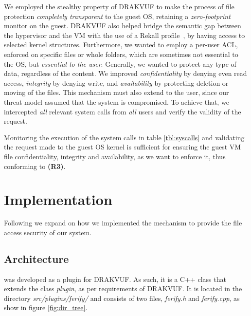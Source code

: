 \par We employed the stealthy property of DRAKVUF to make the process of file protection \emph{completely transparent} to the guest \ac{OS}, retaining a \emph{zero-footprint} monitor on the guest. DRAKVUF also helped bridge the semantic gap between the hypervisor and the \ac{VM} with the use of a Rekall profile~\cite{rekall}, by having access to selected kernel structures. Furthermore, we wanted to employ a per-user \ac{ACL}, enforced on specific files or whole folders, which are sometimes not essential to the \ac{OS}, but \emph{essential to the user}. Generally, we wanted to protect any type of data, regardless of the content. We improved \emph{confidentiality} by denying even read access, \emph{integrity} by denying write, and \emph{availability} by protecting deletion or moving of the files. This mechanism must also extend to the  user, since our threat model assumed that the system is compromised. To achieve that, we intercepted \emph{all} relevant system calls from \emph{all} users and verify the validity of the request. 

\par Monitoring the execution of the system calls in table \ref{tbl:syscalls} and validating the request made to the guest \ac{OS} kernel is sufficient for ensuring the guest \ac{VM} file confidentiality, integrity and availability, as we want to enforce it, thus conforming to \textbf{(R3)}.


\section{Implementation}\label{sec:implementation}

\par Following we expand on how we implemented the mechanism to provide the file access security of our system.

\subsection{Architecture}\label{sub:arch}

\par {} was developed as a plugin for DRAKVUF. As such, it is a C++ class that extends the class \emph{plugin}, as per requirements of DRAKVUF. It is located in the directory \emph{src/plugins/ferify/} and consists of two files, \emph{ferify.h} and \emph{ferify.cpp}, as show in figure \ref{fig:dir_tree}. 

